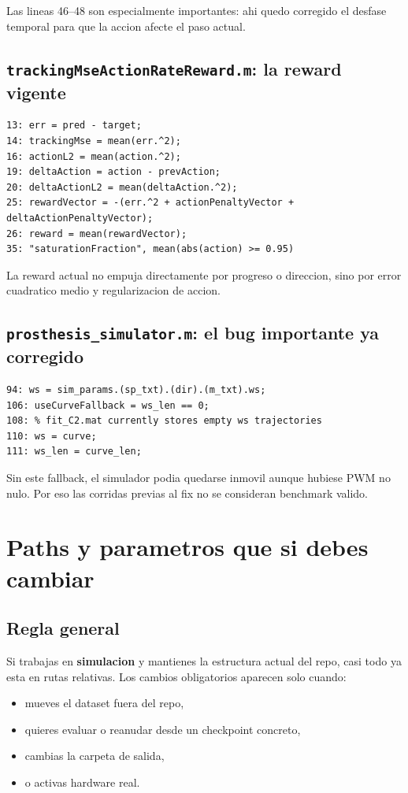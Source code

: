 \documentclass[11pt,a4paper]{article}
\begin{document}
Las lineas 46--48 son especialmente importantes: ahi quedo corregido el desfase temporal para que la accion afecte el paso actual.

\subsection{\texttt{trackingMseActionRateReward.m}: la reward vigente}

\begin{lstlisting}
13: err = pred - target;
14: trackingMse = mean(err.^2);
16: actionL2 = mean(action.^2);
19: deltaAction = action - prevAction;
20: deltaActionL2 = mean(deltaAction.^2);
25: rewardVector = -(err.^2 + actionPenaltyVector + deltaActionPenaltyVector);
26: reward = mean(rewardVector);
35: "saturationFraction", mean(abs(action) >= 0.95)
\end{lstlisting}

La reward actual no empuja directamente por progreso o direccion, sino por error cuadratico medio y regularizacion de accion.

\subsection{\texttt{prosthesis\_simulator.m}: el bug importante ya corregido}

\begin{lstlisting}
94: ws = sim_params.(sp_txt).(dir).(m_txt).ws;
106: useCurveFallback = ws_len == 0;
108: % fit_C2.mat currently stores empty ws trajectories
110: ws = curve;
111: ws_len = curve_len;
\end{lstlisting}

Sin este fallback, el simulador podia quedarse inmovil aunque hubiese PWM no nulo. Por eso las corridas previas al fix no se consideran benchmark valido.

\section{Paths y parametros que si debes cambiar}

\subsection{Regla general}

Si trabajas en \textbf{simulacion} y mantienes la estructura actual del repo, casi todo ya esta en rutas relativas. Los cambios obligatorios aparecen solo cuando:

\begin{itemize}
\item mueves el dataset fuera del repo,
\item quieres evaluar o reanudar desde un checkpoint concreto,
\item cambias la carpeta de salida,
\item o activas hardware real.
\end{itemize}
\end{document}
